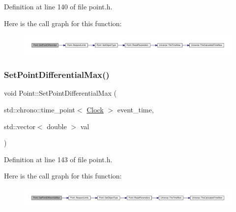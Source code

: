 Definition at line 140 of file point.\+h.

Here is the call graph for this function\+:
\nopagebreak
\begin{figure}[H]
\begin{center}
\leavevmode
\includegraphics[width=350pt]{class_point_adb977a2f01e7a2b549e1bd36fa6f5354_cgraph}
\end{center}
\end{figure}
\mbox{\label{class_point_ac2e53da4cbee0dc39c0b7a4d3e3a6ee5}} 
\subsubsection{\texorpdfstring{Set\+Point\+Differential\+Max()}{SetPointDifferentialMax()}}
{\footnotesize\ttfamily void Point\+::\+Set\+Point\+Differential\+Max (\begin{DoxyParamCaption}\item[{std\+::chrono\+::time\+\_\+point$<$ \hyperlink{universe_8h_a0ef8d951d1ca5ab3cfaf7ab4c7a6fd80}{Clock} $>$}]{event\+\_\+time,  }\item[{std\+::vector$<$ double $>$}]{val }\end{DoxyParamCaption})\hspace{0.3cm}{\ttfamily [inline]}}



Definition at line 143 of file point.\+h.

Here is the call graph for this function\+:
\nopagebreak
\begin{figure}[H]
\begin{center}
\leavevmode
\includegraphics[width=350pt]{class_point_ac2e53da4cbee0dc39c0b7a4d3e3a6ee5_cgraph}
\end{center}
\end{figure}
\mbox{\label{class_point_a0b1ce0db9514762fc3aa9d57fa3034a0}} 
